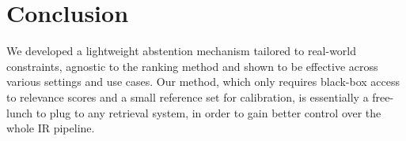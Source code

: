 \section{Conclusion}

We developed a lightweight abstention mechanism tailored to real-world constraints, agnostic to the ranking method and shown to be effective across various settings and use cases. Our method, which only requires black-box access to relevance scores and a small reference set for calibration, is essentially a free-lunch to plug to any retrieval system, in order to gain better control over the whole IR pipeline. 
